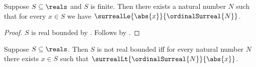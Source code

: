 \begin{theorem}\label{finite_real_set_has_natural_bound}
    Suppose $S\subseteq\reals$ and $S$ is finite.
    Then there exists a natural number $N$ such that for every $x\in S$
        we have $\surrealLe{\abs{x}}{\ordinalSurreal{N}}$.
\end{theorem}
\begin{proof}
    $S$ is real bounded by .
    Follows by .
\end{proof}

\begin{theorem}\label{real_set_unbounded_iff_exceeds_every_natural}
    Suppose $S\subseteq\reals$.
    Then $S$ is not real bounded iff for every natural number $N$
        there exists $x\in S$ such that
            $\surrealLt{\ordinalSurreal{N}}{\abs{x}}$.
\end{theorem}
